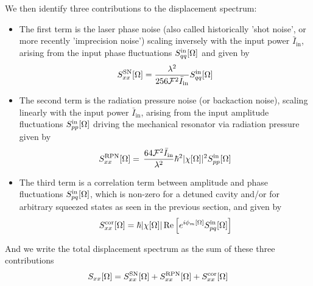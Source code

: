 We then identify three contributions to the displacement spectrum:
\begin{itemize}
  \item The first term is the laser phase noise (also called historically 'shot noise', or more recently 'imprecision noise') scaling inversely with the input power $\bar{I}_\mathrm{in}$, arising from the input phase fluctuations $S_{qq}^{\rm in}[\Omega]$ and given by
  \begin{equation}
    S_{xx}^{\rm SN}[\Omega] = \dfrac{\lambda^2}{256 \mathcal{F}^2 \bar{I}_\mathrm{in}} S_{qq}^{\rm in}[\Omega]
  \end{equation}
  \item The second term is the radiation pressure noise (or backaction noise), scaling linearly with the input power $\bar{I}_\mathrm{in}$, arising from the input amplitude fluctuations $S_{pp}^{\rm in}[\Omega]$ driving the mechanical resonator via radiation pressure given by 
  \begin{equation}
    S_{xx}^{\rm RPN}[\Omega] = \, \dfrac{64 \mathcal{F}^2 \bar{I}_\mathrm{in}}{\lambda^2}\hbar^2 |\chi[\Omega]|^2 S_{pp}^{\rm in}[\Omega]
  \end{equation}
  \item The third term is a correlation term between amplitude and phase fluctuations $S_{pq}^{\rm in}[\Omega]$, which is non-zero for a detuned cavity and/or for arbitrary squeezed states as seen in the previous section, and given by
  \begin{equation}
    S_{xx}^{\rm cor}[\Omega] = \hbar |\chi[\Omega]|\Re\Big[ e^{i\phi_m[\Omega]} S_{pq}^{\rm in}[\Omega]\Big]
  \end{equation}
\end{itemize}
And we write the total displacement spectrum as the sum of these three contributions
\begin{equation}
  S_{xx}[\Omega] = S_{xx}^{\rm SN}[\Omega] + S_{xx}^{\rm RPN}[\Omega] + S_{xx}^{\rm cor}[\Omega]
\end{equation}

